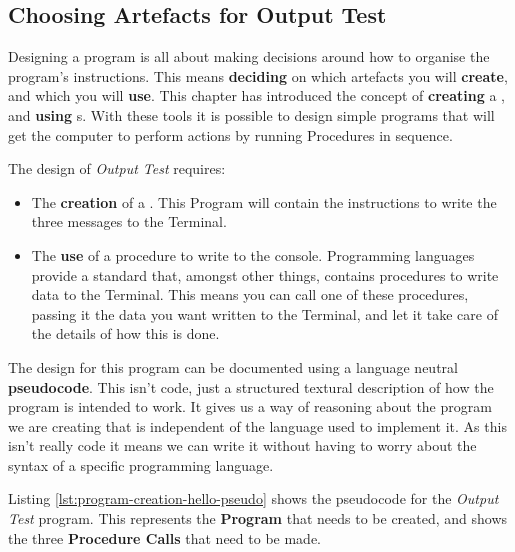\subsection{Choosing Artefacts for Output Test} %
\label{sub:choosing_artefacts_hello_world}

Designing a program is all about making decisions around how to organise the program's instructions. This means \textbf{deciding} on which artefacts you will \textbf{create}, and which you will \textbf{use}. This chapter has introduced the concept of \textbf{creating} a , and \textbf{using} s. With these tools it is possible to design simple programs that will get the computer to perform actions by running Procedures in sequence.

The design of \emph{Output Test} requires:

\begin{itemize}
  \item The \textbf{creation} of a . This Program will contain the instructions to write the three messages to the Terminal.
  \item The \textbf{use} of a procedure to write to the console. Programming languages provide a standard  that, amongst other things, contains procedures to write data to the Terminal. This means you can call one of these procedures, passing it the data you want written to the Terminal, and let it take care of the details of how this is done.
\end{itemize}

\bigskip

The design for this program can be documented using a language neutral \textbf{pseudocode}. This isn't code, just a structured textural description of how the program is intended to work. It gives us a way of reasoning about the program we are creating that is independent of the language used to implement it. As this isn't really code it means we can write it without having to worry about the syntax of a specific programming language.

Listing \ref{lst:program-creation-hello-pseudo} shows the pseudocode for the \emph{Output Test} program. This represents the \textbf{Program} that needs to be created, and shows the three \textbf{Procedure Calls} that need to be made. 


